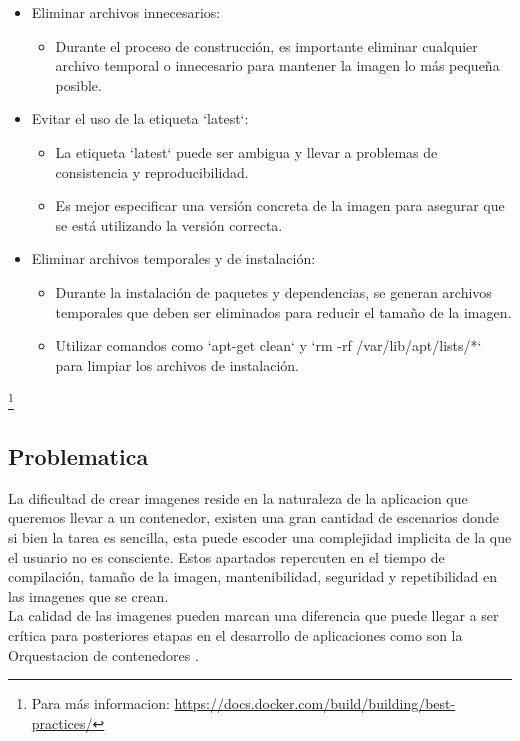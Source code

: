 \documentclass[12pt, a4paper, twoside]{article}
\begin{document}
\begin{itemize}
    \item Eliminar archivos innecesarios:
    \begin{itemize}
        \item Durante el proceso de construcción, es importante eliminar cualquier archivo temporal o innecesario para mantener la imagen lo más pequeña posible.
    \end{itemize}
    
    \item Evitar el uso de la etiqueta `latest`:
    \begin{itemize}
        \item La etiqueta `latest` puede ser ambigua y llevar a problemas de consistencia y reproducibilidad.
        \item Es mejor especificar una versión concreta de la imagen para asegurar que se está utilizando la versión correcta.
    \end{itemize}
    
    \item Eliminar archivos temporales y de instalación:
    \begin{itemize}
        \item Durante la instalación de paquetes y dependencias, se generan archivos temporales que deben ser eliminados para reducir el tamaño de la imagen.
        \item Utilizar comandos como `apt-get clean` y `rm -rf /var/lib/apt/lists/*` para limpiar los archivos de instalación.
    \end{itemize}
    

    
\end{itemize}
\footnote{ Para más informacion: \href{https://docs.docker.com/build/building/best-practices/}{https://docs.docker.com/build/building/best-practices/}}
\newpage 

\subsection{Problematica}
La dificultad de crear imagenes reside en la naturaleza de la aplicacion que queremos llevar a un contenedor, existen una gran cantidad de escenarios donde si bien la tarea es sencilla, esta puede escoder una complejidad implicita
de la que el usuario no es consciente. 
Estos apartados repercuten en el tiempo de compilación, tamaño de la imagen, mantenibilidad, seguridad y repetibilidad en las imagenes que se crean. \\
La calidad de las imagenes pueden marcan una diferencia que puede llegar a ser crítica para posteriores etapas en el desarrollo de aplicaciones como son la Orquestacion de contenedores \cite{ibm_container_orchestration}.
\end{document}
